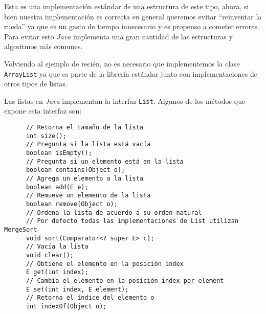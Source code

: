     Esta es una implementación estándar de una estructura de este tipo, ahora, si bien nuestra 
    implementación es correcta en general queremos evitar \enquote{reinventar la rueda} ya que es un
    gasto de tiempo innecesario y es propenso a cometer errores.
    Para evitar esto \textit{Java} implementa una gran cantidad de las estructuras y algoritmos más
    comunes.

    Volviendo al ejemplo de recién, no es necesario que implementemos la clase \texttt{ArrayList} ya
    que es parte de la librería estándar junto con implementaciones de otros tipos de listas.
    
    Las listas en \textit{Java} implementan la interfaz \texttt{List}.
    Algunos de los métodos que expone esta interfaz son:
    \begin{verbatim}
      // Retorna el tamaño de la lista
      int size();
      // Pregunta si la lista está vacía
      boolean isEmpty();
      // Pregunta si un elemento está en la lista
      boolean contains(Object o); 
      // Agrega un elemento a la lista
      boolean add(E e);
      // Remueve un elemento de la lista
      boolean remove(Object o);
      // Ordena la lista de acuerdo a su orden natural
      // Por defecto todas las implementaciones de List utilizan MergeSort
      void sort(Comparator<? super E> c);
      // Vacía la lista
      void clear();
      // Obtiene el elemento en la posición index
      E get(int index);
      // Cambia el elemento en la posición index por element
      E set(int index, E element);
      // Retorna el índice del elemento o
      int indexOf(Object o);
    \end{verbatim}
